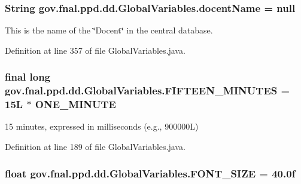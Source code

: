 \hypertarget{classgov_1_1fnal_1_1ppd_1_1dd_1_1GlobalVariables_a1a8699e7b2ec1e9cad652869fedafa2b}{
\subsubsection[{docent\-Name}]{\setlength{\rightskip}{0pt plus 5cm}String gov.\-fnal.\-ppd.\-dd.\-Global\-Variables.\-docent\-Name = null\hspace{0.3cm}{\ttfamily [static]}}}\label{classgov_1_1fnal_1_1ppd_1_1dd_1_1GlobalVariables_a1a8699e7b2ec1e9cad652869fedafa2b}
This is the name of the \char`\"{}\-Docent\char`\"{} in the central database. 

Definition at line 357 of file Global\-Variables.\-java.

\hypertarget{classgov_1_1fnal_1_1ppd_1_1dd_1_1GlobalVariables_ae09d2d42603daf3b4d5fccd1c489a93b}{
\subsubsection[{F\-I\-F\-T\-E\-E\-N\-\_\-\-M\-I\-N\-U\-T\-E\-S}]{\setlength{\rightskip}{0pt plus 5cm}final long gov.\-fnal.\-ppd.\-dd.\-Global\-Variables.\-F\-I\-F\-T\-E\-E\-N\-\_\-\-M\-I\-N\-U\-T\-E\-S = 15\-L $\ast$ O\-N\-E\-\_\-\-M\-I\-N\-U\-T\-E\hspace{0.3cm}{\ttfamily [static]}}}\label{classgov_1_1fnal_1_1ppd_1_1dd_1_1GlobalVariables_ae09d2d42603daf3b4d5fccd1c489a93b}
15 minutes, expressed in milliseconds (e.\-g., 900000\-L) 

Definition at line 189 of file Global\-Variables.\-java.

\hypertarget{classgov_1_1fnal_1_1ppd_1_1dd_1_1GlobalVariables_a9331af89f789ea1b54581c0198f7a43d}{
\subsubsection[{F\-O\-N\-T\-\_\-\-S\-I\-Z\-E}]{\setlength{\rightskip}{0pt plus 5cm}float gov.\-fnal.\-ppd.\-dd.\-Global\-Variables.\-F\-O\-N\-T\-\_\-\-S\-I\-Z\-E = 40.\-0f\hspace{0.3cm}{\ttfamily [static]}}}\label{classgov_1_1fnal_1_1ppd_1_1dd_1_1GlobalVariables_a9331af89f789ea1b54581c0198f7a43d}


